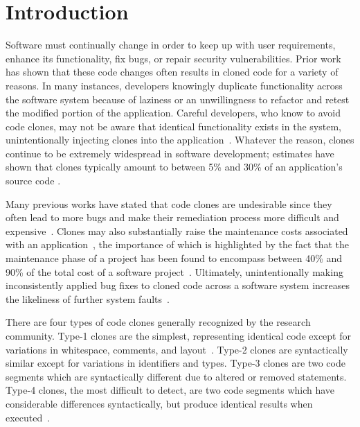 \documentclass[smallextended]{svjour3}       %
\begin{document}
\section{Introduction}
Software must continually change in order to keep up with user requirements, enhance its functionality, fix bugs, or repair security vulnerabilities. Prior work has shown that these code changes often results in cloned code for a variety of reasons. In many instances, developers knowingly duplicate functionality across the software system because of laziness or an unwillingness to refactor and retest the modified portion of the application. Careful developers, who know to avoid code clones, may not be aware that identical functionality exists in the system, unintentionally injecting clones into the application~\cite{Duala-Ekoko:2010:CRD:1767751.1767754,Baker:1995:FDN:832303.836911,Kapser:2006:SAC:1133105.1133106,Li:2006:CFC:1128600.1128814}. Whatever the reason, clones continue to be extremely widespread in software development; estimates have shown that clones typically amount to between 5\% and 30\% of an application's source code \cite{Baxter:1998:CDU:850947.853341,Schulze:2010:CCF:1942788.1868310,Kim:2005:ESC:1095430.1081737}.

Many previous works have stated that code clones are undesirable since they often lead to more bugs and make their remediation process more difficult and expensive~\cite{Mondal:2012:ESC:2387358.2387360,Duala-Ekoko:2010:CRD:1767751.1767754,Baker:1995:FDN:832303.836911,Baxter:1998:CDU:850947.853341}. Clones may also substantially raise the maintenance costs associated with an application~\cite{Juergens:2009:CCM:1555001.1555062}, the importance of which is highlighted by the fact that the maintenance phase of a project has been found to encompass between 40\% and 90\% of the total cost of a software project~\cite{Shukla:2008:ESM:1342211.1342232,Ducasse:1999:LIA:519621.853389,SMR:SMR225,Ueda:2002:GMS:823457.824039,Boehm:2001:SDR:619059.621640,Erlikh:2000:LLS:612986.613032}. Ultimately, unintentionally making inconsistently applied bug fixes to cloned code across a software system increases the likeliness of further system faults~\cite{Deissenboeck_2010}.

There are four types of code clones generally recognized by the research community. Type-1 clones are the simplest, representing identical code except for variations in whitespace, comments, and layout~\cite{4288192}. Type-2 clones are syntactically similar except for variations in identifiers and types. Type-3 clones are two code segments which are syntactically different due to altered or removed statements. Type-4 clones, the most difficult to detect, are two code segments which have considerable differences syntactically, but produce identical results when executed~\cite{Gold:2010:ICC:1808901.1808916,Dang:2012:XTC:2420950.2421004}.
\end{document}
